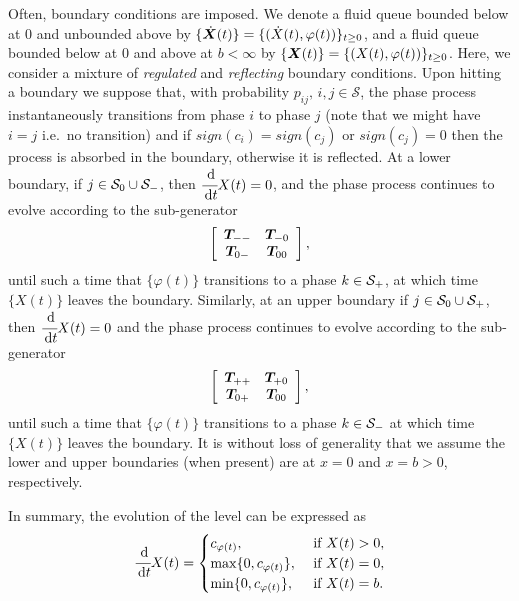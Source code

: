Often, boundary conditions are imposed. We denote a fluid queue bounded below at \(0\) and unbounded above by \(\{\dot{\boldsymbol X}(t)\} = \{(\dot X(t),\varphi(t))\}_{t\geq0}\), and a fluid queue bounded below at \(0\) and above at \(b<\infty\) by \(\{{\boldsymbol X}(t)\} = \{( X(t),\varphi(t))\}_{t\geq0}\). Here, we consider a mixture of \emph{regulated} and \emph{reflecting} boundary conditions. Upon hitting a boundary we suppose that, with probability \(p_{ij},\,i,j\in\mathcal S\), the phase process instantaneously transitions from phase \(i\) to phase \(j\) (note that we might have \(i=j\) i.e.~no transition) and if \(sign(c_i)=sign(c_j)\) or \(sign(c_j)=0\) then the process is absorbed in the boundary, otherwise it is reflected. At a lower boundary, if \(j\in\mathcal{S}_0\cup\mathcal{S}_-\), then \(\cfrac{\, \mathrm{d}}{\, \mathrm{d} t} X(t) = 0\), and the phase process continues to evolve according to the sub-generator 
\[\left[\begin{array}{cc} \boldsymbol T_{--} & \boldsymbol T_{-0} \\ \boldsymbol T_{0-} & \boldsymbol T_{00}  \end{array}\right],\]
until such a time that \(\{\varphi(t)\}\) transitions to a phase \(k\in\mathcal{S}_+\), at which time \(\{X(t)\}\) leaves the boundary. Similarly, at an upper boundary if \(j\in\mathcal{S}_0\cup\mathcal{S}_+\), then \(\cfrac{\, \mathrm{d}}{\, \mathrm{d} t} X(t) = 0\) and the phase process continues to evolve according to the sub-generator 
\[\left[\begin{array}{cc} \boldsymbol T_{++} & \boldsymbol T_{+0} \\ \boldsymbol T_{0+} & \boldsymbol T_{00}  \end{array}\right],\]
until such a time that \(\{\varphi(t)\}\) transitions to a phase \(k\in\mathcal{S}_-\) at which time \(\{X(t)\}\) leaves the boundary. It is without loss of generality that we assume the lower and upper boundaries (when present) are at \(x=0\) and \(x=b>0\), respectively.

In summary, the evolution of the level can be expressed as 
\[\cfrac{\, \mathrm{d}}{\, \mathrm{d} t} X(t) = \begin{cases} c_{\varphi(t)}, & \mbox{ if } X(t)>0, \\ \max\{0,c_{\varphi(t)}\}, & \mbox{ if } X(t)=0, \\ \min\{0,c_{\varphi(t)}\}, & \mbox{ if } X(t)=b.  \end{cases}\]

